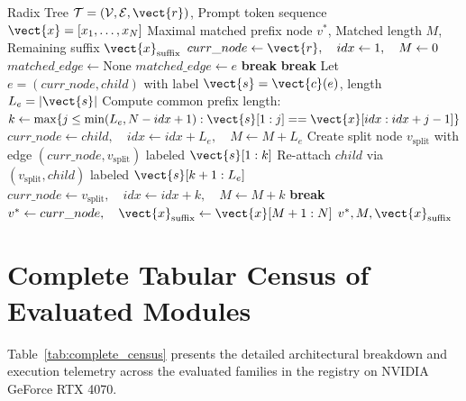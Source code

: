 \begin{algorithm}[h]
\caption[Radix Prefix Tree Traversal and Dynamic Node Splitting in SGLang]{Radix Prefix Tree Traversal and Dynamic Node Splitting in SGLang}
\label{alg:radix_tree}
\begin{algorithmic}[1]
\REQUIRE Radix Tree $\mathcal{T}=(\mathcal{V}, \mathcal{E}, \vect{r})$, Prompt token sequence $\vect{x} = [x_1, \dots, x_N]$
\ENSURE Maximal matched prefix node $v^*$, Matched length $M$, Remaining suffix $\vect{x}_{\text{suffix}}$
\STATE $curr\_node \leftarrow \vect{r}, \quad idx \leftarrow 1, \quad M \leftarrow 0$
    \STATE $matched\_edge \leftarrow \text{None}$
            \STATE $matched\_edge \leftarrow e$
            \STATE \textbf{break}
        \ENDIF
    \ENDFOR
        \STATE \textbf{break} 
    \ENDIF
    \STATE Let $e = (curr\_node, child)$ with label $\vect{s} = \vect{c}(e)$, length $L_e = |\vect{s}|$
    \STATE Compute common prefix length: $k \leftarrow \max \{ j \le \min(L_e, N - idx + 1) : \vect{s}[1:j] == \vect{x}[idx : idx + j - 1] \}$
        \STATE $curr\_node \leftarrow child, \quad idx \leftarrow idx + L_e, \quad M \leftarrow M + L_e$
    \ELSE
        \STATE {}
        \STATE Create split node $v_{\text{split}}$ with edge $(curr\_node, v_{\text{split}})$ labeled $\vect{s}[1:k]$
        \STATE Re-attach $child$ via $(v_{\text{split}}, child)$ labeled $\vect{s}[k+1:L_e]$
        \STATE $curr\_node \leftarrow v_{\text{split}}, \quad idx \leftarrow idx + k, \quad M \leftarrow M + k$
        \STATE \textbf{break}
    \ENDIF
\ENDWHILE
\STATE $v^* \leftarrow curr\_node, \quad \vect{x}_{\text{suffix}} \leftarrow \vect{x}[M+1:N]$
\RETURN $v^*, M, \vect{x}_{\text{suffix}}$
\end{algorithmic}
\end{algorithm}

\section{Complete Tabular Census of Evaluated Modules}
\label{sec:appendix_census}

Table~\ref{tab:complete_census} presents the detailed architectural breakdown and execution telemetry across the evaluated families in the \neuralops{} registry on NVIDIA GeForce RTX 4070.

